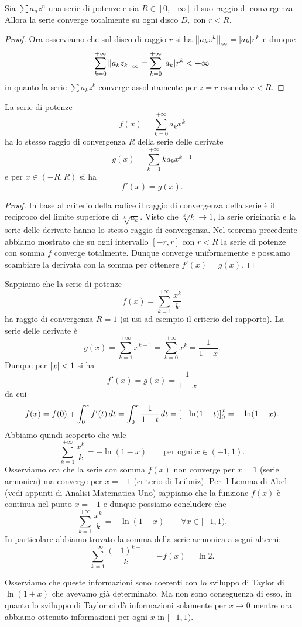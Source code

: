 \begin{theorem}
\label{th:convergenza_totale}
\mymark{***}%
Sia $\sum a_n z^n$ una serie di potenze e sia $R\in[0,+\infty]$ il suo raggio di convergenza. Allora la serie converge totalmente su ogni disco $D_r$ con $r<R$.
\end{theorem}
%
\begin{proof}
Ora osserviamo che sul disco di raggio $r$ si ha ${\left\Vert a_k z^k\right\Vert}_\infty = {\left|a_k\right|} r^k$ e dunque
\[
\sum_{k=0}^{+\infty} {\left\Vert a_k z_k\right\Vert}_\infty
= \sum_{k=0}^{+\infty} {\left|a_k\right|}r^k < +\infty
\]
in quanto la serie $\sum a_k z^k$ converge assolutamente per $z=r$ essendo $r<R$.
\end{proof}

\begin{corollary}
\label{cor:derivata_serie_potenze}
\mymark{**}
La serie di potenze
\[
  f(x) = \sum_{k=0}^{+\infty} a_k x^k
\]
ha lo stesso raggio di convergenza $R$ della serie delle derivate
\[
  g(x) = \sum_{k=1}^{+\infty} k a_k x^{k-1}
\]
e per $x\in (-R,R)$ si ha
\[
  f'(x) = g(x).
\]
\end{corollary}
%
\begin{proof}
In base al criterio della radice
il raggio di convergenza della serie è il reciproco 
del limite superiore di $\sqrt[k]{a_k}$. 
Visto che $\sqrt[k]{k} \to 1$, la serie originaria 
e la serie delle derivate hanno lo stesso raggio di
convergenza.
Nel teorema precedente abbiamo mostrato che su ogni 
intervallo $[-r,r]$ con $r<R$ la serie di potenze 
con somma $f$ converge totalmente. 
Dunque converge uniformemente e possiamo scambiare 
la derivata con la somma per ottenere $f'(x) = g(x)$.
\end{proof}

\begin{example}
Sappiamo che la serie di potenze
\[
f(x) = \sum_{k=1}^{+\infty} \frac{x^k}{k}
\]
ha raggio di convergenza $R=1$ (si usi ad esempio il criterio del rapporto). La serie delle derivate è
\[
 g(x) = \sum_{k=1}^{+\infty} x^{k-1} = \sum_{k=0}^{+\infty}x^k = \frac{1}{1-x}.
\]
Dunque per ${\left|x\right|}<1$ si ha
\[
  f'(x) = g(x) = \frac{1}{1-x}
\]
da cui
\[
 f(x) = f(0) + \int_0^x f'(t)\, dt = \int_0^x \frac{1}{1-t}\, dt
  = {\left[ -\ln(1-t) \right]}_0^x = -\ln(1-x).
\]
Abbiamo quindi scoperto che vale
\[
  \sum_{k=1}^{+\infty} \frac{x^k}{k} = - \ln (1-x) \qquad\text{per ogni $x\in (-1,1)$.}
\]
Osserviamo ora che la serie con somma $f(x)$
non converge per $x=1$ (serie armonica) ma
converge per $x=-1$ (criterio di Leibniz).
Per il Lemma di Abel (vedi appunti di Analisi Matematica Uno)
sappiamo che la funzione $f(x)$ è continua nel punto $x=-1$ 
e dunque possiamo concludere che
\[
  \sum_{k=1}^{+\infty} \frac{x^k}{k} = -\ln(1-x)
  \qquad \forall x \in [-1,1).
\]
In particolare abbiamo trovato la somma della serie armonica a segni alterni:
\[
  \sum_{k=1}^{+\infty} \frac{(-1)^{k+1}}{k} = - f(x) = \ln 2.
\]

Osserviamo che queste informazioni sono coerenti con lo sviluppo di Taylor di $\ln(1+x)$ che avevamo già determinato. Ma non sono conseguenza di esso, in quanto lo sviluppo di Taylor ci dà informazioni solamente per $x\to 0$ mentre ora abbiamo ottenuto informazioni per ogni $x$ in $[-1,1)$.
 \end{example}

